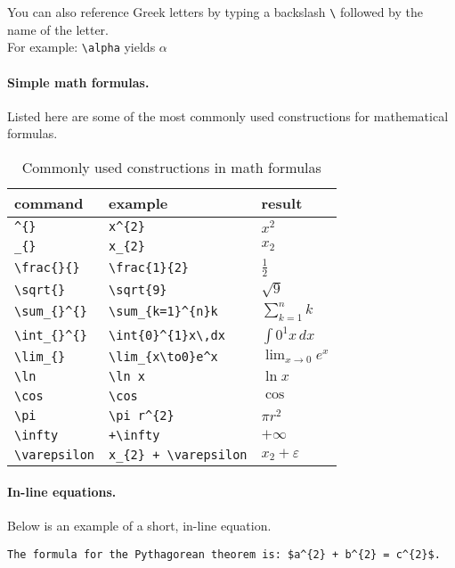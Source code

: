 \documentclass[11pt]{article}
\begin{document}
\noindent You can also reference Greek letters by typing a backslash \verb|\| followed by the name of the letter.\\For example: \verb|\alpha| yields $\alpha$

\paragraph{Simple math formulas.} Listed here are some of the most commonly used constructions for mathematical formulas.

\begin{table}[htbp]
  \centering
  \caption{Commonly used constructions in math formulas}
    \begin{tabular}{lll}
    \toprule
    command & example & result \\
    \midrule
    \verb|^{}| & \verb|x^{2}| & $x^{2}$ \\
    \verb|_{}| & \verb|x_{2}| & $x_{2}$ \\
    \verb|\frac{}{}| & \verb|\frac{1}{2}| & $\frac{1}{2}$ \\
    \verb|\sqrt{}| & \verb|\sqrt{9}| & $\sqrt{9}$ \\
    \verb|\sum_{}^{}| & \verb|\sum_{k=1}^{n}k| & $\sum_{k=1}^{n}k$ \\
    \verb|\int_{}^{}| & \verb|\int{0}^{1}x\,dx| & $\int{0}^{1}x\,dx$ \\
    \verb|\lim_{}| & \verb|\lim_{x\to0}e^x| & $\lim_{x\to0}e^x$ \\
    \verb|\ln| & \verb|\ln x| & $\ln x$ \\
    \verb|\cos| & \verb|\cos| & $\cos$\\
    \verb|\pi| & \verb|\pi r^{2}| & $\pi r^{2}$ \\
    \verb|\infty| & \verb|+\infty| & $+\infty$ \\
    \verb|\varepsilon| & \verb|x_{2} + \varepsilon| & $x_{2} + \varepsilon$ \\
    \bottomrule
    \end{tabular}%
  \label{tab:addlabel}%
\end{table}%

\newpage
\paragraph{In-line equations.} Below is an example of a short, in-line equation.

\begin{lstlisting}
The formula for the Pythagorean theorem is: $a^{2} + b^{2} = c^{2}$.
\end{lstlisting}
\end{document}
